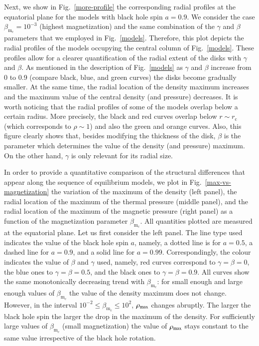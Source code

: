 \documentclass{aa}
\begin{document}
Next, we show in Fig.~\ref{more-profile} the corresponding radial profiles at the equatorial plane for the models with black hole spin $a=0.9$. We consider the case $\beta_{\mathrm{m}_{\mathrm{c}}}
=10^{-3}$ (highest magnetization) and the same combination of the $\gamma$ and $\beta$ parameters that we employed in Fig.~\ref{models}. Therefore, this plot depicts the radial profiles of the models occupying the central column of Fig.~\ref{models}. These profiles allow for a clearer quantification of the radial extent of the disks with $\gamma$ and $\beta$. As mentioned in the description of Fig.~\ref{models} as $\gamma$ and $\beta$ increase from 0 to 0.9 (compare black, blue, and green curves) the disks become gradually smaller. At the same time, the radial location of the density maximum increases and the maximum value of the central density (and pressure) decreases. It is worth noticing that the radial profiles of some of the models overlap below a certain radius. More precisely, the black and red curves overlap below $r\sim r_{\mathrm{c}}$ (which corresponds to $\rho \sim 1$) and also the green and orange curves. Also, this figure clearly shows that, besides modifying the thickness of the disk, $\beta$ is the parameter which determines the value of the density (and pressure) maximum. On the other hand, $\gamma$ is only relevant for its radial size.



 
In order to provide a quantitative comparison of the structural differences that appear along the sequence of equilibrium models, we plot in Fig.~\ref{max-vs-magnetization} the variation of the maximum of the density (left panel), the radial location of the maximum of the thermal pressure (middle panel), and the radial location of the maximum of the magnetic pressure (right panel) as a function of the magnetization parameter $\beta_{\mathrm{m}_{\mathrm{c}}}
$. All quantities plotted are measured at the equatorial plane. Let us first consider the left panel. The line type used indicates the value of the black hole spin $a$, namely, a dotted line is for $a=0.5$, a dashed line for $a=0.9$, and a solid line for $a=0.99$. Correspondingly, the colour indicates the value of $\beta$ and $\gamma$ used, namely, red curves correspond to $\gamma=\beta=0$, the blue ones to $\gamma=\beta=0.5$, and the black ones to $\gamma=\beta=0.9$. All curves show the same monotonically decreasing trend with $\beta_{\mathrm{m}_{\mathrm{c}}}
$: for small enough and large enough values of $\beta_{\mathrm{m}_{\mathrm{c}}}
$ the value of the density maximum does not change. However, in the interval $10^{-2}\le \beta_{\mathrm{m}_{\mathrm{c}}}
 \le 10^{2}$, $\rho_{\rm max}$ changes abruptly. The larger the black hole spin the larger the drop in the maximum of the density. For sufficiently large values of $\beta_{\mathrm{m}_{\mathrm{c}}}
$ (small magnetization) the value of $\rho_{\rm max}$ stays constant to the same value irrespective of the black hole rotation.
\end{document}
